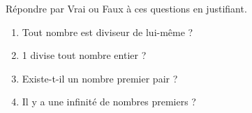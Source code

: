 
Répondre par Vrai ou Faux à ces questions en justifiant.
\begin{enumerate}
\item Tout nombre est diviseur de lui-même ?
\item 1 divise tout nombre entier ?
\item Existe-t-il un nombre premier pair ?
\item Il y a une infinité de nombres premiers ?
\end{enumerate}